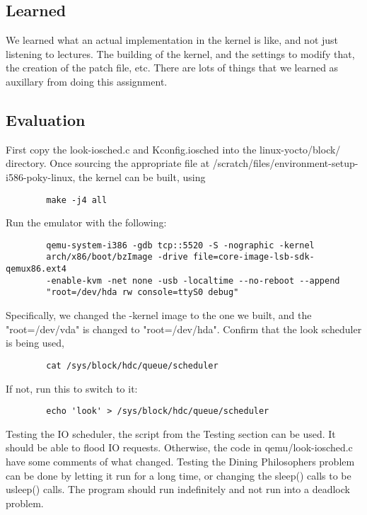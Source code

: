 \documentclass[letterpaper,10pt]{article}
\begin{document}
	\subsection{Learned}
	We learned what an actual implementation in the kernel is like, and not just listening to lectures. The building of the kernel, and the settings to modify that, the creation of the patch file, etc. There are lots of things that we learned as auxillary from doing this assignment.

	\subsection{Evaluation}
	First copy the look-iosched.c and Kconfig.iosched into the linux-yocto/block/ directory. Once sourcing the appropriate file at /scratch/files/environment-setup-i586-poky-linux, the kernel can be built, using 
	\begin{verbatim}
		make -j4 all
	\end{verbatim}
	Run the emulator with the following:
	\begin{lstlisting}
		qemu-system-i386 -gdb tcp::5520 -S -nographic -kernel 
		arch/x86/boot/bzImage -drive file=core-image-lsb-sdk-qemux86.ext4 
		-enable-kvm -net none -usb -localtime --no-reboot --append 
		"root=/dev/hda rw console=ttyS0 debug"
	\end{lstlisting}
	Specifically, we changed the -kernel image to the one we built, and the "root=/dev/vda" is changed to "root=/dev/hda".
	Confirm that the look scheduler is being used, 
	\begin{verbatim}
		cat /sys/block/hdc/queue/scheduler
	\end{verbatim}
	If not, run this to switch to it:
	\begin{verbatim}
		echo 'look' > /sys/block/hdc/queue/scheduler
	\end{verbatim}
	Testing the  IO scheduler, the script from the Testing section can be used. It should be able to flood IO requests. Otherwise, the code in qemu/look-iosched.c have some comments of what changed.
	Testing the Dining Philosophers problem can be done by letting it run for a long time, or changing the sleep() calls to be usleep() calls. The program should run indefinitely and not run into a deadlock problem.
	
	
	
\end{document}
